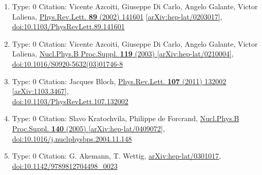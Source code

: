 \documentclass[a4paper,10pt]{article}
\begin{document}
\begin{enumerate}
\begin{enumerate}
  \item Type: 0 Citation: Vicente Azcoiti, Giuseppe Di Carlo, Angelo Galante, Victor Laliena, \href{https://www.doi.org/10.1103/PhysRevLett.89.141601}{Phys.Rev.Lett. {\bf 89} (2002) 141601}  \href{https://arxiv.org/abs/hep-lat/0203017}{[arXiv:hep-lat/0203017]},\\\href{https://www.doi.org/10.1103/PhysRevLett.89.141601}{doi:10.1103/PhysRevLett.89.141601}
  \item Type: 0 Citation: Vicente Azcoiti, Giuseppe Di Carlo, Angelo Galante, Victor Laliena, \href{https://www.doi.org/10.1016/S0920-5632(03)01746-8}{Nucl.Phys.B Proc.Suppl. {\bf 119} (2003) }  \href{https://arxiv.org/abs/hep-lat/0210004}{[arXiv:hep-lat/0210004]},\\\href{https://www.doi.org/10.1016/S0920-5632(03)01746-8}{doi:10.1016/S0920-5632(03)01746-8}
  \item Type: 0 Citation: Jacques Bloch, \href{https://www.doi.org/10.1103/PhysRevLett.107.132002}{Phys.Rev.Lett. {\bf 107} (2011) 132002}  \href{https://arxiv.org/abs/1103.3467}{[arXiv:1103.3467]},\\\href{https://www.doi.org/10.1103/PhysRevLett.107.132002}{doi:10.1103/PhysRevLett.107.132002}
  \item Type: 0 Citation: Slavo Kratochvila, Philippe de Forcrand, \href{https://www.doi.org/10.1016/j.nuclphysbps.2004.11.148}{Nucl.Phys.B Proc.Suppl. {\bf 140} (2005) }  \href{https://arxiv.org/abs/hep-lat/0409072}{[arXiv:hep-lat/0409072]},\\\href{https://www.doi.org/10.1016/j.nuclphysbps.2004.11.148}{doi:10.1016/j.nuclphysbps.2004.11.148}
  \item Type: 0 Citation: G. Akemann, T. Wettig, \href{https://arxiv.org/abs/hep-lat/0301017}{arXiv:hep-lat/0301017},\\\href{https://www.doi.org/10.1142/9789812704498_0023}{doi:10.1142/9789812704498\_0023}

\end{enumerate}
\end{enumerate}
\end{document}
